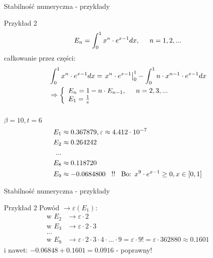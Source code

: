 \begin{frame}{Stabilność numeryczna - przykłady}
	\begin{exampleblock}{Przykład 2}
		\[
        	E_n = \int_0^1 x^n \cdot e^{x-1} dx, \hspace{.5cm} n = 1, 2, ...
        \]
        całkowanie przez części:
        \\[-15pt]
		\begin{align*}
			& \int_0^1 x^n \cdot e^{x-1} dx = 
            \left. x^n \cdot e^{x-1}
            \right|_0^1 - \int_0^1 n \cdot x^{n-1} \cdot e^{x-1} dx \\
            & \Rightarrow
            \left\{
            	\begin{array}{ll}
            		E_n = 1-n \cdot E_{n-1}, \hspace{.5cm} n = 2, 3, ... \\
                    E_1 = \frac{1}{e}
            	\end{array}
            \right.
		\end{align*}
        \\[-5pt]
        $\beta = 10, t = 6$
        \\[-13pt]
        \begin{align*}
        	E_1 &\approx 0.367879, \varepsilon \approx 4.412 \cdot 10^{-7} \\
            E_2 &\approx 0.264242 \\
            ... \\
            E_8 &\approx 0.118720 \\
            E_9 &\approx -0.0684800 \hspace{.3cm} !! \hspace{.3cm} \text{Bo: } x^9 \cdot e^{x-1} \ge 0, x \in [0, 1]
        \end{align*}
	\end{exampleblock}
\end{frame}
\begin{frame}{Stabilność numeryczna - przykłady}
	\begin{exampleblock}{Przykład 2}
		Powód $\rightarrow \varepsilon(E_1):$
        \begin{align*}
        	\text{w } E_2 &\rightarrow \varepsilon \cdot 2 \\
        	\text{w } E_3 &\rightarrow \varepsilon \cdot 2 \cdot 3 \\
            ... \\
            \text{w } E_9 &\rightarrow \varepsilon \cdot 2 \cdot 3 \cdot 4 \cdot ... \cdot 9 = \varepsilon \cdot 9! = \varepsilon \cdot 362880 \approx 0.1601
        \end{align*}
        i nawet: $-0.06848 + 0.1601 = 0.0916$ - poprawny!
	\end{exampleblock}
\end{frame}
